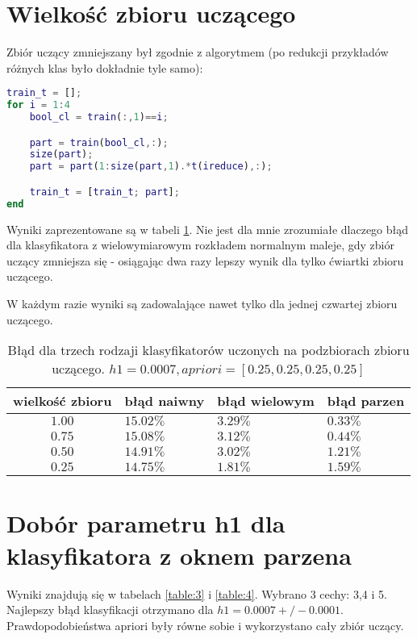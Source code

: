 \documentclass[fleqn]{article}
\begin{document}
\section{Wielkość zbioru uczącego}
Zbiór uczący zmniejszany był zgodnie z algorytmem (po redukcji przykładów różnych klas było dokładnie tyle samo):

\begin{minipage}{\linewidth}
\begin {lstlisting}[language=Matlab]
train_t = [];
for i = 1:4
    bool_cl = train(:,1)==i;

    part = train(bool_cl,:);
    size(part);
    part = part(1:size(part,1).*t(ireduce),:);

    train_t = [train_t; part];
end
\end{lstlisting}
\end{minipage}

Wyniki zaprezentowane są w tabeli \ref{table:2}.
Nie jest dla mnie zrozumiałe dlaczego błąd dla klasyfikatora z wielowymiarowym rozkładem normalnym maleje, gdy zbiór uczący zmniejsza się - osiągając dwa razy lepszy wynik dla tylko ćwiartki zbioru uczącego. 

W każdym razie wyniki są zadowalające nawet tylko dla jednej czwartej zbioru uczącego.

\begin {table}
\begin{center}
\begin{tabular}{clll}
    \hline
    wielkość zbioru & błąd naiwny & błąd wielowym & błąd parzen \\
    \hline
    $1.00$ & $15.02\%$ & $3.29\%$ & $0.33\%$\\
    $0.75$ & $15.08\%$ & $3.12\%$ & $0.44\%$\\
    $0.50$ & $14.91\%$ & $3.02\%$ & $1.21\%$\\
    $0.25$ & $14.75\%$ & $1.81\%$ & $1.59\%$\\
    \hline
\end{tabular}
\caption {Błąd dla trzech rodzaji klasyfikatorów uczonych na podzbiorach zbioru uczącego. $h1=0.0007, apriori = [0.25,0.25,0.25,0.25]$}
\label{table:2}
\end{center}
\end {table}


\section{Dobór parametru h1 dla klasyfikatora z oknem parzena}
Wyniki znajdują się w tabelach \ref{table:3} i \ref{table:4}. Wybrano 3 cechy: 3,4 i 5. Najlepszy błąd klasyfikacji otrzymano dla $h1 = 0.0007 +/- 0.0001$. Prawdopodobieństwa apriori były równe sobie i wykorzystano cały zbiór uczący.
\end{document}
